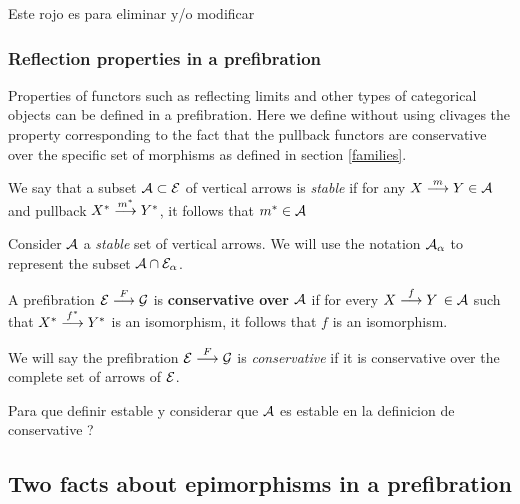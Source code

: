 {\erojo  Este rojo es para eliminar y/o modificar
%
\subsubsection{Reflection properties in a prefibration}
Properties of functors such as reflecting limits and other types of categorical objects can be defined in a prefibration. Here we define without using clivages the property corresponding to the fact that the pullback functors are conservative over the specific set of morphisms as defined in section \ref{families}.  

 We say that a subset $\mathcal{A} \subset \mathcal{E}$ of vertical arrows is 
 \emph{stable} if for any $X \overset {m} {\longrightarrow} Y \in \mathcal{A}$ and pullback $X^* \overset {m^*} {\longrightarrow} Y^*$, it follows that $m^* \in \mathcal{A}$

Consider $\mathcal{A}$ a \textit{stable} set of vertical arrows. We will use the notation  $\mathcal{A}_\alpha$ to represent the subset $\mathcal{A} \cap \mathcal{E}_\alpha$. 


\begin{definition}
A prefibration ${\mathcal{E} \overset {F} {\longrightarrow} \mathcal{G}}$ is \textbf{conservative over 
$\mathcal{A}$} if for every \mbox{$X \overset {f} {\longrightarrow} Y \, \in \mathcal{A}$} such that 
$X^* \overset {f^*} {\longrightarrow} Y^*$ is an isomorphism, it follows that $f$ is an isomorphism.
\end{definition}

 We will say the prefibration ${\mathcal{E} \overset {F} {\longrightarrow} \mathcal{G}}$ is \textit{conservative} if it is conservative over the complete set of arrows of $\mathcal{E}$. 

{\noindent \erojo Para que definir estable y considerar que $\mathcal{A}$ es estable en la definicion de conservative ?}
}

\subsection{Two facts about epimorphisms in a prefibration}

